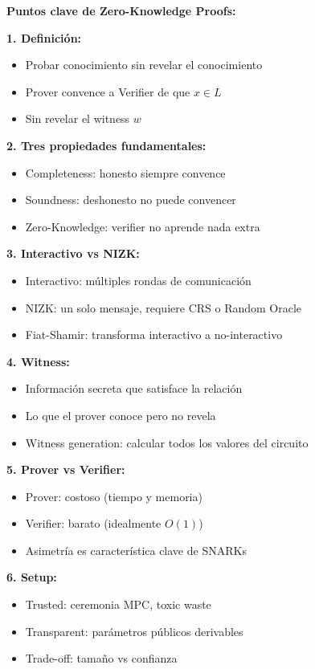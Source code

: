 \documentclass[11pt,a4paper,twoside,openright]{book}
\theoremstyle{definition}
\theoremstyle{plain}
\theoremstyle{remark}
\begin{document}
\begin{keyidea}
\textbf{Puntos clave de Zero-Knowledge Proofs:}

\textbf{1. Definición:}
\begin{itemize}
    \item Probar conocimiento sin revelar el conocimiento
    \item Prover convence a Verifier de que $x \in L$
    \item Sin revelar el witness $w$
\end{itemize}

\textbf{2. Tres propiedades fundamentales:}
\begin{itemize}
    \item Completeness: honesto siempre convence
    \item Soundness: deshonesto no puede convencer
    \item Zero-Knowledge: verifier no aprende nada extra
\end{itemize}

\textbf{3. Interactivo vs NIZK:}
\begin{itemize}
    \item Interactivo: múltiples rondas de comunicación
    \item NIZK: un solo mensaje, requiere CRS o Random Oracle
    \item Fiat-Shamir: transforma interactivo a no-interactivo
\end{itemize}

\textbf{4. Witness:}
\begin{itemize}
    \item Información secreta que satisface la relación
    \item Lo que el prover conoce pero no revela
    \item Witness generation: calcular todos los valores del circuito
\end{itemize}

\textbf{5. Prover vs Verifier:}
\begin{itemize}
    \item Prover: costoso (tiempo y memoria)
    \item Verifier: barato (idealmente $O(1)$)
    \item Asimetría es característica clave de SNARKs
\end{itemize}

\textbf{6. Setup:}
\begin{itemize}
    \item Trusted: ceremonia MPC, toxic waste
    \item Transparent: parámetros públicos derivables
    \item Trade-off: tamaño vs confianza
\end{itemize}


\end{keyidea}
\end{document}
